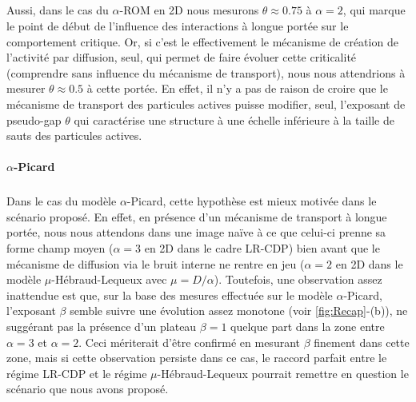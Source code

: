 \subparagraph{}Aussi, dans le cas du $\alpha$-ROM en 2D nous mesurons $\theta \approx 0.75$ à $\alpha = 2$, qui marque le point de début de l'influence des interactions à longue portée sur le comportement critique. Or, si c'est le effectivement le mécanisme de création de l'activité par diffusion, seul,  qui permet de faire évoluer cette criticalité (comprendre sans influence du mécanisme de transport), nous nous attendrions à mesurer $\theta \approx 0.5$ à cette portée. En effet, il n'y a pas de raison de croire que le mécanisme de transport des particules actives puisse modifier, seul, l'exposant de pseudo-gap $\theta$ qui caractérise une structure à une échelle inférieure à la taille de sauts des particules actives.

\paragraph{$\alpha$-Picard}

\subparagraph{}Dans le cas du modèle $\alpha$-Picard, cette hypothèse est mieux motivée dans le scénario proposé. En effet, en présence d'un mécanisme de transport à longue portée, nous nous attendons dans une image naïve à ce que celui-ci prenne sa forme champ moyen ($\alpha = 3$ en 2D dans le cadre LR-CDP) bien avant que le mécanisme de diffusion via le bruit interne ne rentre en jeu ($\alpha = 2$ en 2D dans le modèle $\mu$-Hébraud-Lequeux avec $\mu = D / \alpha$). Toutefois, une observation assez inattendue est que, sur la base des mesures effectuée sur le modèle $\alpha$-Picard, l'exposant $\beta$ semble suivre une évolution assez monotone (voir \autoref{fig:Recap}-(b)), ne suggérant pas la présence d'un plateau $\beta = 1$ quelque part dans la zone entre $\alpha = 3$ et $\alpha = 2$. Ceci mériterait d'être confirmé en mesurant $\beta$ finement dans cette zone, mais si cette observation persiste dans ce cas, le raccord parfait entre le régime LR-CDP et le régime $\mu$-Hébraud-Lequeux pourrait remettre en question le scénario que nous avons proposé.

